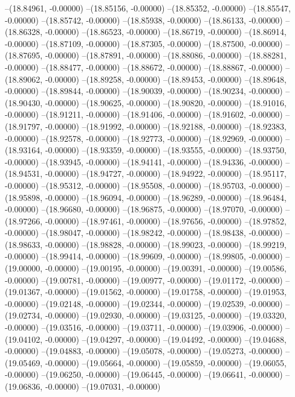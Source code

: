 --(18.84961, -0.00000)
--(18.85156, -0.00000)
--(18.85352, -0.00000)
--(18.85547, -0.00000)
--(18.85742, -0.00000)
--(18.85938, -0.00000)
--(18.86133, -0.00000)
--(18.86328, -0.00000)
--(18.86523, -0.00000)
--(18.86719, -0.00000)
--(18.86914, -0.00000)
--(18.87109, -0.00000)
--(18.87305, -0.00000)
--(18.87500, -0.00000)
--(18.87695, -0.00000)
--(18.87891, -0.00000)
--(18.88086, -0.00000)
--(18.88281, -0.00000)
--(18.88477, -0.00000)
--(18.88672, -0.00000)
--(18.88867, -0.00000)
--(18.89062, -0.00000)
--(18.89258, -0.00000)
--(18.89453, -0.00000)
--(18.89648, -0.00000)
--(18.89844, -0.00000)
--(18.90039, -0.00000)
--(18.90234, -0.00000)
--(18.90430, -0.00000)
--(18.90625, -0.00000)
--(18.90820, -0.00000)
--(18.91016, -0.00000)
--(18.91211, -0.00000)
--(18.91406, -0.00000)
--(18.91602, -0.00000)
--(18.91797, -0.00000)
--(18.91992, -0.00000)
--(18.92188, -0.00000)
--(18.92383, -0.00000)
--(18.92578, -0.00000)
--(18.92773, -0.00000)
--(18.92969, -0.00000)
--(18.93164, -0.00000)
--(18.93359, -0.00000)
--(18.93555, -0.00000)
--(18.93750, -0.00000)
--(18.93945, -0.00000)
--(18.94141, -0.00000)
--(18.94336, -0.00000)
--(18.94531, -0.00000)
--(18.94727, -0.00000)
--(18.94922, -0.00000)
--(18.95117, -0.00000)
--(18.95312, -0.00000)
--(18.95508, -0.00000)
--(18.95703, -0.00000)
--(18.95898, -0.00000)
--(18.96094, -0.00000)
--(18.96289, -0.00000)
--(18.96484, -0.00000)
--(18.96680, -0.00000)
--(18.96875, -0.00000)
--(18.97070, -0.00000)
--(18.97266, -0.00000)
--(18.97461, -0.00000)
--(18.97656, -0.00000)
--(18.97852, -0.00000)
--(18.98047, -0.00000)
--(18.98242, -0.00000)
--(18.98438, -0.00000)
--(18.98633, -0.00000)
--(18.98828, -0.00000)
--(18.99023, -0.00000)
--(18.99219, -0.00000)
--(18.99414, -0.00000)
--(18.99609, -0.00000)
--(18.99805, -0.00000)
--(19.00000, -0.00000)
--(19.00195, -0.00000)
--(19.00391, -0.00000)
--(19.00586, -0.00000)
--(19.00781, -0.00000)
--(19.00977, -0.00000)
--(19.01172, -0.00000)
--(19.01367, -0.00000)
--(19.01562, -0.00000)
--(19.01758, -0.00000)
--(19.01953, -0.00000)
--(19.02148, -0.00000)
--(19.02344, -0.00000)
--(19.02539, -0.00000)
--(19.02734, -0.00000)
--(19.02930, -0.00000)
--(19.03125, -0.00000)
--(19.03320, -0.00000)
--(19.03516, -0.00000)
--(19.03711, -0.00000)
--(19.03906, -0.00000)
--(19.04102, -0.00000)
--(19.04297, -0.00000)
--(19.04492, -0.00000)
--(19.04688, -0.00000)
--(19.04883, -0.00000)
--(19.05078, -0.00000)
--(19.05273, -0.00000)
--(19.05469, -0.00000)
--(19.05664, -0.00000)
--(19.05859, -0.00000)
--(19.06055, -0.00000)
--(19.06250, -0.00000)
--(19.06445, -0.00000)
--(19.06641, -0.00000)
--(19.06836, -0.00000)
--(19.07031, -0.00000)
